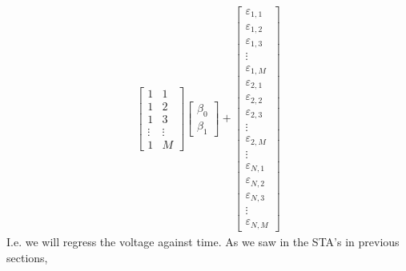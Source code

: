 \begin{align}
\begin{bmatrix}
        1 & 1 \\
        1 & 2 \\
        1 & 3 \\
        \vdots & \vdots \\
        1 & M
    \end{bmatrix}
    \begin{bmatrix}
        β_0 \\
        β_1
    \end{bmatrix}
    +
    \begin{bmatrix}
        ε_{1,1} \\
        ε_{1,2} \\
        ε_{1,3} \\
        \vdots \\
        ε_{1,M} \\
        ε_{2,1} \\
        ε_{2,2} \\
        ε_{2,3} \\
        \vdots \\
        ε_{2,M} \\
        \vdots \\
        ε_{N,1} \\
        ε_{N,2} \\
        ε_{N,3} \\
        \vdots \\
        ε_{N,M}
    \end{bmatrix}
\end{align}
I.e. we will regress the voltage against time. As we saw in the STA's in previous sections,







